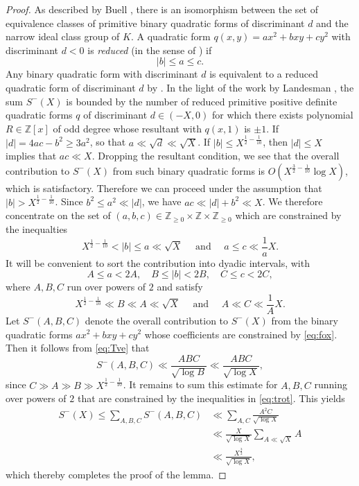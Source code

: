 \documentclass[reqno, 12pt, twoside]{amsart}
\numberwithin{equation}{section}
\newcommand{\Z}{\mathbb{Z}}
\newcommand{\ZZ}{\mathbb{Z}}
\newcommand{\0}{\mathbf{0}}
\theoremstyle{definition}
\renewcommand{\leq}{\leqslant}
\renewcommand{\geq}{\geqslant}
\begin{document}
\begin{proof}
As described by Buell \cite[Prop.~6.20]{Buell}, 
there is an isomorphism between the set of equivalence classes of primitive binary quadratic forms of discriminant $d$ and  the narrow ideal class group of $K$. A quadratic form $q(x,y)=ax^2+bxy+cy^2$ with discriminant $d<0$ is \emph{reduced} (in the sense of \cite[Eq.~(2.1)]{Buell}) if 
$$
|b|\leq a\leq c.
$$
Any binary quadratic form with 
discriminant  $d$ is equivalent to a reduced quadratic form of 
discriminant  $d$ by  \cite[Thm.~2.3]{Buell}.
In the light of the work by Landesman \cite[Thm.~1.1]{aaron}, the sum
$S^-(X)$ is bounded by the number of 
reduced primitive positive definite quadratic forms $q$ of discriminant  $d\in (-X,0)$ for which 
there exists 
polynomial $R\in \ZZ[x]$ of odd degree whose   resultant with $q(x,1)$ is $\pm 1$. 
If $|d|=4ac-b^2\geq 3a^2$, so that 
$a\ll \sqrt{d}\ll \sqrt{X}$.
If $|b|\leq X^{\frac{1}{2}-\frac{1}{10}}$, then
$|d|\leq X$ implies that $ac\ll X$.  
Dropping the resultant condition, we see that the overall contribution to $S^-(X)$ from 
such binary quadratic forms 
is  $O(X^{\frac{3}{2}-\frac{1}{10}}\log X)$, which is satisfactory. 
Therefore we can proceed under the assumption that $|b|>X^{\frac{1}{2}-\frac{1}{10}}$.
Since $b^2\leq a^2\ll |d|$, we have $ac\ll|d|+b^2\ll X$.
We therefore  concentrate on the set of $(a,b,c)\in \Z_{\geq 0}\times \Z\times \Z_{\geq 0}$ which are constrained by the inequalties
\[X^{\frac{1}{2}-\frac{1}{10}}<|b|\leq a\ll  \sqrt{X}\quad \text{ and }\quad a\leq c\ll \frac{1}{a}X.\]
It will be convenient to sort the contribution into dyadic intervals, with 
\begin{equation}\label{eq:fox}
A\leq a<2A,\quad B\leq |b|<2B,\quad C\leq c<2C,
\end{equation}
where $A,B,C$ run over powers of $2$ and satisfy
\begin{equation}\label{eq:trot}
X^{\frac{1}{2}-\frac{1}{10}}\ll B\ll A\ll\sqrt{X}\quad \text{ and }\quad A\ll C\ll \frac{1}{A}X.
\end{equation}
Let $S^-(A,B,C)$ denote the overall contribution to $S^-(X)$ from the binary quadratic forms 
$ax^2+bxy+cy^2$ whose coefficients are constrained by \eqref{eq:fox}.
Then it follows from \eqref{eq:Tve}
that 
$$
S^-(A,B,C)\ll \frac{ABC}{\sqrt{\log B}}\ll 
\frac{ABC}{\sqrt{\log X}},
$$
since $C\gg A\gg B\gg X^{\frac{1}{2}-\frac{1}{10}}$. 
It remains to  sum this  estimate for 
 $A,B,C$ running over powers of $2$ that are constrained by the 
inequalities in \eqref{eq:trot}. This yields
\begin{align*}
S^-(X)\leq \sum_{A,B,C} S^-(A,B,C)
&\ll \sum_{A,C} 
\frac{A^2C}{\sqrt{\log X}}\\
&\ll \frac{X}{\sqrt{\log X}}
\sum_{A\ll \sqrt{X}} 
A\\
&\ll \frac{X^{\frac{3}{2}}}{\sqrt{\log X}},
\end{align*}
which thereby completes the proof of the lemma.
\end{proof}
\end{document}
